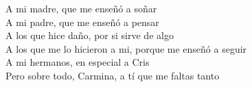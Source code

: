 

\renewcommand{\contentsname}{Índice General}
\renewcommand{\listtablename}{Lista de Tablas}
\renewcommand{\tablename}{Tabla}


\newpage
\thispagestyle{empty}
\begin{flushright}
	\phantom{blank}
	\vspace{25mm}

	A mi madre, que me enseñó a soñar \\
	A mi padre, que me enseñó a pensar  \\
	A los que hice daño, por si sirve de algo  \\
	A los que me lo hicieron a mi, porque me enseñó a seguir  \\
	A mi hermanos, en especial a Cris  \\
	Pero sobre todo, Carmina, a tí que me faltas tanto  \\
\end{flushright}


\tableofcontents
\newpage
\cleardoublepage
\listoffigures %
\cleardoublepage
\listoftables %

\newpage	